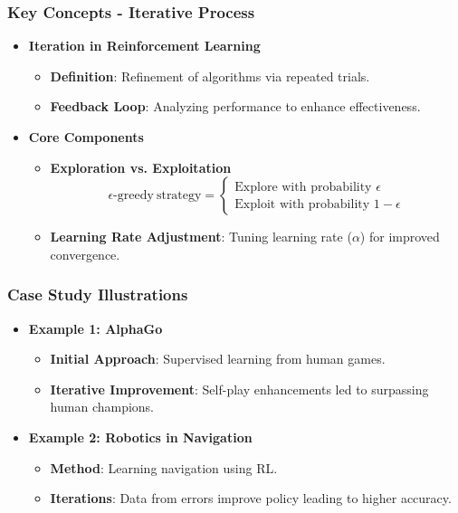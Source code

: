 \documentclass[aspectratio=169]{beamer}
\begin{document}
\begin{frame}[fragile]
    \frametitle{Key Concepts - Iterative Process}
    \begin{itemize}
        \item \textbf{Iteration in Reinforcement Learning}
            \begin{itemize}
                \item \textbf{Definition}: Refinement of algorithms via repeated trials.
                \item \textbf{Feedback Loop}: Analyzing performance to enhance effectiveness.
            \end{itemize}
        \item \textbf{Core Components}
            \begin{itemize}
                \item \textbf{Exploration vs. Exploitation}
                    \begin{equation}
                    \epsilon\text{-greedy}\: \text{strategy} =
                    \begin{cases}
                      \text{Explore with probability } \epsilon \\
                      \text{Exploit with probability } 1 - \epsilon
                    \end{cases}
                    \end{equation}
                \item \textbf{Learning Rate Adjustment}: Tuning learning rate ($\alpha$) for improved convergence.
            \end{itemize}
    \end{itemize}
\end{frame}

\begin{frame}[fragile]
    \frametitle{Case Study Illustrations}
    \begin{itemize}
        \item \textbf{Example 1: AlphaGo}
            \begin{itemize}
                \item \textbf{Initial Approach}: Supervised learning from human games.
                \item \textbf{Iterative Improvement}: Self-play enhancements led to surpassing human champions.
            \end{itemize}
        \item \textbf{Example 2: Robotics in Navigation}
            \begin{itemize}
                \item \textbf{Method}: Learning navigation using RL.
                \item \textbf{Iterations}: Data from errors improve policy leading to higher accuracy.
            \end{itemize}
    \end{itemize}
\end{frame}
\end{document}
